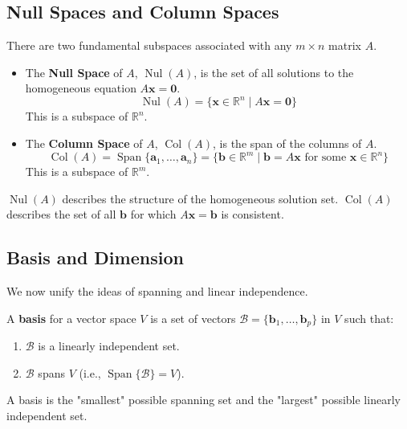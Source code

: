 \documentclass[oneside]{book}
\begin{document}
\subsection{Null Spaces and Column Spaces}
There are two fundamental subspaces associated with any $m \times n$ matrix $A$.

\begin{definition}
\begin{itemize}
    \item The \textbf{Null Space} of $A$, $\operatorname{Nul}(A)$, is the set of all solutions to the homogeneous equation $A\mathbf{x} = \mathbf{0}$.
    \[ \operatorname{Nul}(A) = \{ \mathbf{x} \in \mathbb{R}^n \mid A\mathbf{x} = \mathbf{0} \} \]
    This is a subspace of $\mathbb{R}^n$.
    
    \item The \textbf{Column Space} of $A$, $\operatorname{Col}(A)$, is the span of the columns of $A$.
    \[ \operatorname{Col}(A) = \operatorname{Span}\{\mathbf{a}_1, \ldots, \mathbf{a}_n\} = \{ \mathbf{b} \in \mathbb{R}^m \mid \mathbf{b} = A\mathbf{x} \text{ for some } \mathbf{x} \in \mathbb{R}^n \} \]
    This is a subspace of $\mathbb{R}^m$.
\end{itemize}
\end{definition}

$\operatorname{Nul}(A)$ describes the structure of the homogeneous solution set.
$\operatorname{Col}(A)$ describes the set of all $\mathbf{b}$ for which $A\mathbf{x} = \mathbf{b}$ is consistent.

\subsection{Basis and Dimension}
We now unify the ideas of spanning and linear independence.

\begin{definition}
A \textbf{basis} for a vector space $V$ is a set of vectors $\mathcal{B} = \{\mathbf{b}_1, \ldots, \mathbf{b}_p\}$ in $V$ such that:
\begin{enumerate}
    \item $\mathcal{B}$ is a linearly independent set.
    \item $\mathcal{B}$ spans $V$ (i.e., $\operatorname{Span}\{\mathcal{B}\} = V$).
\end{enumerate}
\end{definition}
A basis is the "smallest" possible spanning set and the "largest" possible linearly independent set.
\end{document}
